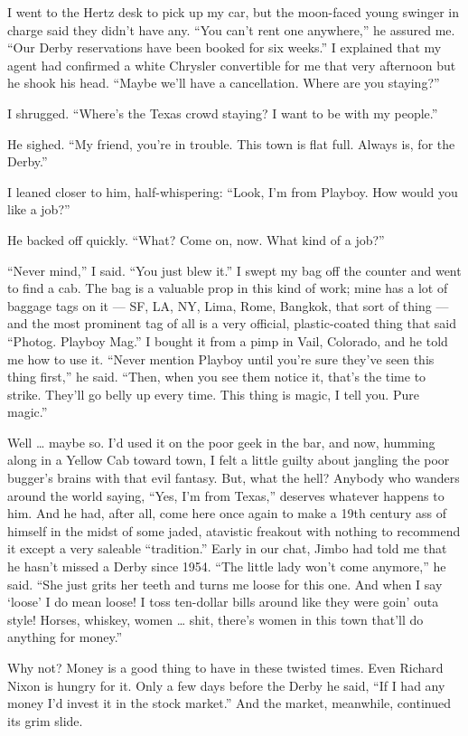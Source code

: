 \documentclass[10pt,a4paper]{article}
\begin{document}
I went to the Hertz desk to pick up my car, but the moon-faced young swinger in charge said they didn’t have any. “You can’t rent one anywhere,” he assured me. “Our Derby reservations have been booked for six weeks.” I explained that my agent had confirmed a white Chrysler convertible for me that very afternoon but he shook his head. “Maybe we’ll have a cancellation. Where are you staying?”

I shrugged. “Where’s the Texas crowd staying? I want to be with my people.”

He sighed. “My friend, you’re in trouble. This town is flat full. Always is, for the Derby.”

I leaned closer to him, half-whispering: “Look, I’m from Playboy. How would you like a job?”

He backed off quickly. “What? Come on, now. What kind of a job?”

“Never mind,” I said. “You just blew it.” I swept my bag off the counter and went to find a cab. The bag is a valuable prop in this kind of work; mine has a lot of baggage tags on it — SF, LA, NY, Lima, Rome, Bangkok, that sort of thing — and the most prominent tag of all is a very official, plastic-coated thing that said “Photog. Playboy Mag.” I bought it from a pimp in Vail, Colorado, and he told me how to use it. “Never mention Playboy until you’re sure they’ve seen this thing first,” he said. “Then, when you see them notice it, that’s the time to strike. They’ll go belly up every time. This thing is magic, I tell you. Pure magic.”

Well … maybe so. I’d used it on the poor geek in the bar, and now, humming along in a Yellow Cab toward town, I felt a little guilty about jangling the poor bugger’s brains with that evil fantasy. But, what the hell? Anybody who wanders around the world saying, “Yes, I’m from Texas,” deserves whatever happens to him. And he had, after all, come here once again to make a 19th century ass of himself in the midst of some jaded, atavistic freakout with nothing to recommend it except a very saleable “tradition.” Early in our chat, Jimbo had told me that he hasn’t missed a Derby since 1954. “The little lady won’t come anymore,” he said. “She just grits her teeth and turns me loose for this one. And when I say ‘loose’ I do mean loose! I toss ten-dollar bills around like they were goin’ outa style! Horses, whiskey, women … shit, there’s women in this town that’ll do anything for money.”

Why not? Money is a good thing to have in these twisted times. Even Richard Nixon is hungry for it. Only a few days before the Derby he said, “If I had any money I’d invest it in the stock market.” And the market, meanwhile, continued its grim slide.
\end{document}

